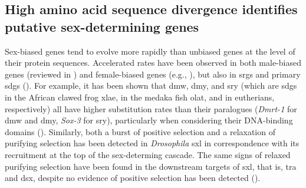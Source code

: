 \documentclass[../main.tex]{subfiles}
\begin{document}
\subsection{High amino acid sequence divergence identifies putative sex-determining genes}
Sex-biased genes tend to evolve more rapidly than unbiased genes at the level of their protein sequences. Accelerated rates have been observed in both male-biased genes (reviewed in \textbf{\cite{parsch2013evolutionary,grath2016sex}}) and female-biased genes (e.g., \textbf{\cite{papa2017anopheles, ghiselli2018comparative}}), but also in \glspl{srg} and primary \glspl{sdg} (\textbf{\cite{oNeil1992drosophila_tra, whitfield1993rapid, deBono1996evolution}}). For example, it has been shown that \gls{dmw}, \gls{dmy}, and \gls{sry} (which are \glspl{sdg} in the African clawed frog \gls{xlae}, in the medaka fish \gls{olat}, and in eutherians, respectively) all have higher substitution rates than their paralogues (\textit{Dmrt-1} for \gls{dmw} and \gls{dmy}, \textit{Sox-3} for \gls{sry}), particularly when considering their DNA-binding domains (\textbf{\cite{mawaribuchi2012molecular}}). Similarly, both a burst of positive selection and a relaxation of purifying selection has been detected in \textit{Drosophila} \gls{sxl} in correspondence with its recruitment at the top of the sex-determing cascade. The same signs of relaxed purifying selection have been found in the downstream targets of \gls{sxl}, that is, \gls{tra} and \gls{dsx}, despite no evidence of positive selection has been detected (\textbf{\cite{mullon2012drosophila_sxl}}).
\end{document}
